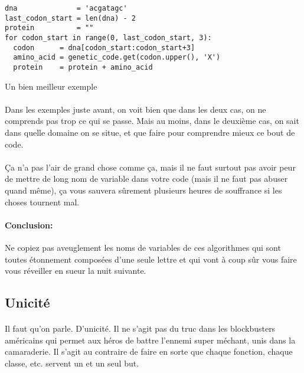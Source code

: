 \begin{listing}[H]
	\centering
	\begin{verbatim}
dna              = 'acgatagc'
last_codon_start = len(dna) - 2
protein          = ""
for codon_start in range(0, last_codon_start, 3):
  codon      = dna[codon_start:codon_start+3]
  amino_acid = genetic_code.get(codon.upper(), 'X')
  protein    = protein + amino_acid
	\end{verbatim}
	\caption{Un bien meilleur exemple}
\end{listing}

\paragraph{} Dans les exemples juste avant, on voit bien que dans les deux cas,
on ne comprends pas trop ce qui se passe. Mais au moins, dans le deuxième cas,
on sait dans quelle domaine on se situe, et que faire pour comprendre mieux ce
bout de code.

\paragraph{} Ça n'a pas l'air de grand chose comme ça, mais il ne faut surtout
pas avoir peur de mettre de long nom de variable dans votre code (mais il ne
faut pas abuser quand même), ça vous sauvera sûrement plusieurs heures de
souffrance si les choses tournent mal.

\paragraph{Conclusion:} Ne copiez pas aveuglement les noms de variables de ces
algorithmes qui sont toutes étonnement composées d'une seule lettre et qui vont
à coup sûr vous faire vous réveiller en sueur la nuit suivante.

\subsection{Unicité}

\paragraph{} Il faut qu'on parle. D'unicité. Il ne s'agit pas du truc dans les
blockbusters américains qui permet aux héros de battre l'ennemi super méchant,
unis dans la camaraderie. Il s'agit au contraire de faire en sorte que chaque
fonction, chaque classe, etc. servent un et un seul but.


